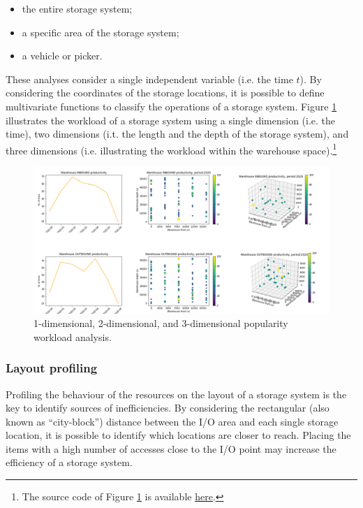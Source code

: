 \begin{itemize}
    \item the entire storage system;
    \item a specific area of the storage system;
    \item a vehicle or picker.

\end{itemize}

These analyses consider a single independent variable (i.e. the time $t$). By considering the coordinates of the storage locations, it is possible to define multivariate functions to classify the operations of a storage system. Figure \ref{fig_workload_profile2D} illustrates the workload of a storage system using a single dimension (i.e. the time), two dimensions (i.t. the length and the depth of the storage system), and three dimensions (i.e. illustrating the workload within the warehouse space).\footnote{The source code of Figure \ref{fig_workload_profile2D} is available \href{https://github.com/aletuf93/logproj/blob/master/examples/WH_01\%20Warehouse\%20productivity\%20assessment.ipynb}{here}.}


\begin{figure}[hbt!]
\centering
\includegraphics[width=1.0\textwidth]{SectionWarehouses/control_figures/fig_workload_profile2D.png}
\captionsetup{type=figure}
\caption{1-dimensional, 2-dimensional, and 3-dimensional popularity workload analysis.}
\label{fig_workload_profile2D}
\end{figure}

\clearpage

\subsubsection{Layout profiling}
Profiling the behaviour of the resources on the layout of a storage system is the key to identify sources of inefficiencies. By considering the rectangular (also known as “city-block”) distance between the I/O area and each single storage location, it is possible to identify which locations are closer to reach. Placing the items with a high number of accesses close to the I/O point may increase the efficiency of a storage system.\par

